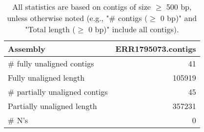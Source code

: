 \documentclass[12pt,a4paper]{article}
\begin{document}
\begin{table}[ht]
\begin{center}
\caption{All statistics are based on contigs of size $\geq$ 500 bp, unless otherwise noted (e.g., "\# contigs ($\geq$ 0 bp)" and "Total length ($\geq$ 0 bp)" include all contigs).}
\begin{tabular}{|l*{1}{|r}|}
\hline
Assembly & ERR1795073.contigs \\ \hline
\# fully unaligned contigs & 41 \\ \hline
Fully unaligned length & 105919 \\ \hline
\# partially unaligned contigs & 45 \\ \hline
Partially unaligned length & 357231 \\ \hline
\# N's & 0 \\ \hline
\end{tabular}
\end{center}
\end{table}
\end{document}
